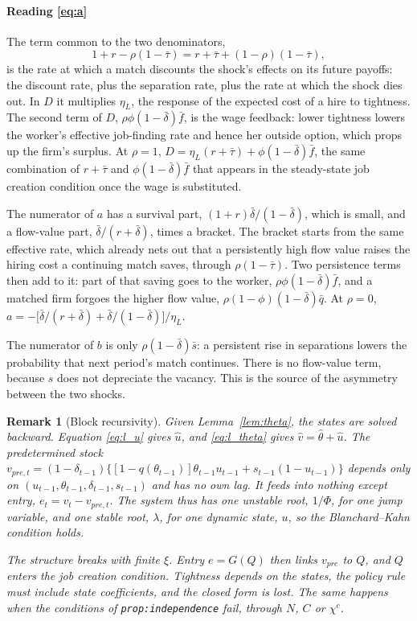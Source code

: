 \documentclass[authoryear, review, 12pt]{elsarticle}
\newtheorem{remark}{Remark}
\begin{document}
\paragraph{Reading \eqref{eq:a}}
The term common to the two denominators,
\[
	1+r-\rho(1-\bar\tau)=r+\bar\tau+(1-\rho)(1-\bar\tau),
\]
is the rate at which a match discounts the shock's effects on its future payoffs: the
discount rate, plus the separation rate, plus the rate at which the shock dies out. In $D$
it multiplies $\eta_L$, the response of the expected cost of a hire to tightness. The second
term of $D$, $\rho\phi(1-\bar\delta)\bar f$, is the wage feedback: lower tightness lowers the
worker's effective job-finding rate and hence her outside option, which props up the firm's
surplus. At $\rho=1$, $D=\eta_L(r+\bar\tau)+\phi(1-\bar\delta)\bar f$, the same combination of
$r+\bar\tau$ and $\phi(1-\bar\delta)\bar f$ that appears in the steady-state job creation
condition once the wage is substituted.

The numerator of $a$ has a survival part, $(1+r)\bar\delta/(1-\bar\delta)$, which is small,
and a flow-value part, $\bar\delta/(r+\bar\delta)$, times a bracket. The bracket starts from
the same effective rate, which already nets out that a persistently high flow value raises
the hiring cost a continuing match saves, through $\rho(1-\bar\tau)$. Two persistence terms
then add to it: part of that saving goes to the worker, $\rho\phi(1-\bar\delta)\bar f$, and a
matched firm forgoes the higher flow value, $\rho(1-\phi)(1-\bar\delta)\bar q$. At $\rho=0$,
$a=-\bigl[\bar\delta/(r+\bar\delta)+\bar\delta/(1-\bar\delta)\bigr]/\eta_L$.

The numerator of $b$ is only $\rho(1-\bar\delta)\bar s$: a persistent rise in separations
lowers the probability that next period's match continues. There is no flow-value term,
because $s$ does not depreciate the vacancy. This is the source of the asymmetry between the
two shocks.

\begin{remark}[Block recursivity]\label{rem:recursive}
Given Lemma~\ref{lem:theta}, the states are solved backward. Equation \eqref{eq:l_u} gives
$\hat u$, and \eqref{eq:l_theta} gives $\hat v=\hat\theta+\hat u$. The predetermined stock
$v_{pre,t}=(1-\delta_{t-1})\{[1-q(\theta_{t-1})]\theta_{t-1}u_{t-1}+s_{t-1}(1-u_{t-1})\}$
depends only on $(u_{t-1},\theta_{t-1},\delta_{t-1},s_{t-1})$ and has no own lag. It feeds
into nothing except entry, $e_t=v_t-v_{pre,t}$. The system thus has one unstable root,
$1/\Phi$, for one jump variable, and one stable root, $\lambda$, for one dynamic state, $u$,
so the Blanchard--Kahn condition holds.

The structure breaks with finite $\xi$. Entry $e=G(Q)$ then links $v_{pre}$ to $Q$, and $Q$
enters the job creation condition. Tightness depends on the states, the policy rule must
include state coefficients, and the closed form is lost. The same happens when the
conditions of \texttt{prop:independence} fail, through $N$, $C$ or $\chi^c$.
\end{remark}
\end{document}
